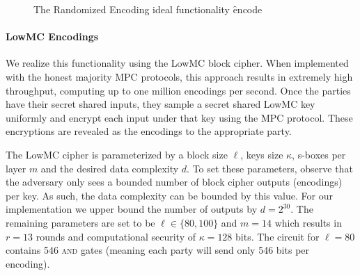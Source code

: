 \begin{figure}[ht]
\vspace{-0.3cm}
	\caption{The Randomized Encoding ideal functionality \f{encode}}
	\label{fig:randomized-encode-ideal}	
	\vspace{-0.3cm}
\end{figure}


\paragraph{LowMC Encodings}
We realize this functionality using the LowMC block cipher\cite{lowmc}. When implemented with the honest majority MPC protocols\cite{highthroughput}, this approach results in extremely high throughput, computing up to one million encodings per second. Once the parties have their secret shared inputs, they sample a secret shared LowMC key uniformly and encrypt each input under that key using the MPC protocol. These encryptions are revealed as the encodings to the appropriate party.


The LowMC cipher is parameterized by a block size $\ell$, keys size $\kappa$, s-boxes per layer $m$ and the desired data complexity $d$. To set these parameters, observe that the adversary only sees a bounded number of block cipher outputs (encodings) per key. As such, the data complexity can be bounded by this value. For our implementation we upper bound the number of outputs by $d= 2^{30}$. The remaining parameters are set to be $\ell\in\{80, 100\}$ and $m=14$ which results in $r=13$ rounds and computational security of $\kappa=128$ bits\cite{lowmc}. The circuit for $\ell=80$ contains 546 \textsc{and} gates (meaning each party will send only 546 bits per encoding).

